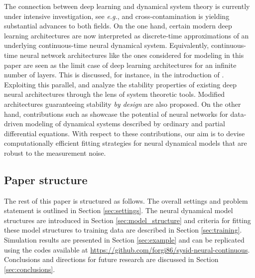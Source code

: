 \documentclass{article} %
\begin{document}
The connection between deep learning and dynamical system theory is currently under intensive investigation, see \emph{e.g.}, \citep{weinan2017proposal} and cross-contamination is yielding substantial advances to both fields. 
On the one hand, certain modern deep learning architectures are now interpreted as discrete-time approximations of an underlying continuous-time neural dynamical system. {Equivalently, continuous-time neural network architectures like the ones considered for modeling in this paper are seen as the limit case of deep learning architectures for an infinite number of layers. This is discussed, for instance, in the introduction of \cite{chen2018neural}.}
Exploiting this parallel, \citep{haber2017stable} and \citep{ruthotto2019deep} analyze the stability properties of existing deep neural architectures through the lens of system theoretic tools. Modified  architectures guaranteeing stability \emph{by design} are also proposed.
On the other hand, contributions such as \cite{raissi2019physics, long2019pde, rackauckas2020universal} showcase the potential of neural networks for data-driven modeling of dynamical systems described by ordinary and partial differential equations. With respect to these contributions, our aim is to devise computationally efficient fitting strategies for neural dynamical models that are robust to the measurement noise.

{\subsection{Paper structure}}
The  rest of this paper is structured as follows. The overall settings and problem statement is outlined in Section \ref{sec:settings}. The neural dynamical model structures are introduced in Section \ref{sec:model_structure} and   criteria for fitting these model structures to training data are described in Section \ref{sec:training}. Simulation results are presented in Section \ref{sec:example} and can be replicated using the codes available at \url{https://github.com/forgi86/sysid-neural-continuous}.  Conclusions and directions  for future research are  discussed in Section \ref{sec:conclusions}. 
\end{document}
